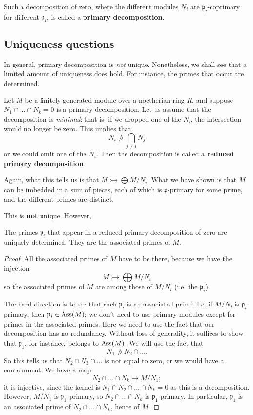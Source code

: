 \begin{definition} 
Such a decomposition of zero, where the different modules $N_i$ are
$\mathfrak{p}_i$-coprimary for different $\mathfrak{p}_i$, is called a \textbf{primary decomposition}.
\end{definition} 



\subsection{Uniqueness questions}

In general, primary decomposition is \emph{not} unique. Nonetheless, we shall
see that a limited amount of uniqueness does hold. For instance, the primes
that occur are determined.

Let $M$ be a finitely generated module over a noetherian ring $R$, and suppose
$N_1 \cap \dots \cap N_k = 0$ is a primary decomposition.
Let us assume that the decomposition is
\emph{minimal}: that is, if we dropped one of the $N_i$, the intersection would no
longer be zero.
This implies that
\[ N_i \not\supset \bigcap_{j \neq i} N_j  \]
or we could omit one of the $N_i$. Then the decomposition is called a \textbf{reduced primary decomposition}.

Again, what this tells us is that $M \rightarrowtail  \bigoplus M/N_i$. What we
have shown is that $M$ can be imbedded in a sum of pieces, each of which is
$\mathfrak{p}$-primary for some prime, and the different primes are distinct.

This is \textbf{not} unique. However, 

\begin{proposition} 
The primes $\mathfrak{p}_i$ that appear in a reduced primary decomposition of zero are
uniquely determined. They are the associated primes of $M$.
\end{proposition} 
\begin{proof} 
All the associated primes of $M$ have to be there, because we have the injection
\[ M \rightarrowtail  \bigoplus M/N_i  \]
so the associated primes of $M$ are among those of $M/N_i$ (i.e. the
$\mathfrak{p}_i$).

The hard direction is to see that each $\mathfrak{p}_i$ is an associated prime.
I.e. if $M/N_i$ is $\mathfrak{p}_i$-primary, then $\mathfrak{p}_i \in \operatorname{Ass}(M)$;
we don't need to use primary modules except for primes in the associated primes. 
Here we need to use the fact that our decomposition has no redundancy.  Without
loss of generality, it suffices to show that $\mathfrak{p}_1$, for instance,
belongs to $\operatorname{Ass}(M)$. We will use the fact that
\[ N_1 \not\supset N_2 \cap \dots .  \]
So this tells us that $N_2 \cap N_3 \cap \dots$ is not equal to zero, or we
would have a containment. We have a map
\[ N_2 \cap \dots \cap N_k \to M/N_1;  \]
it is injective, since the kernel is $N_1 \cap N_2 \cap \dots \cap N_k = 0$ as
this is a decomposition.
However, $M/N_1$ is $\mathfrak{p}_1$-primary, so $N_2 \cap \dots \cap N_k$ is
$\mathfrak{p}_1$-primary. In particular, $\mathfrak{p}_1$ is an associated
prime of $N_2 \cap \dots \cap N_k$, hence of  $M$.
\end{proof} 

